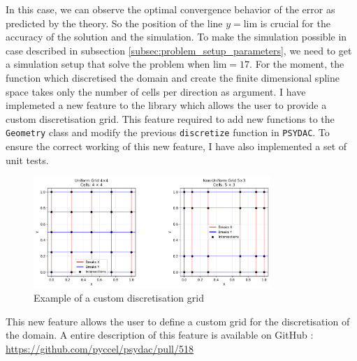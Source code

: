 \documentclass[a4paper,12pt,twoside]{report}
\begin{document}
In this case, we can observe the optimal convergence behavior of the error as predicted by the theory. So the position of the line $y = \text{lim}$ is crucial for the accuracy of the solution and the simulation.
To make the simulation possible in case described in subsection \ref{subsec:problem_setup_parameters}, we need to get a simulation setup that solve the problem when $\text{lim} = 17$.
For the moment, the function which discretised the domain and create the finite dimensional spline space takes only the number of cells per direction as argument. I have implemeted a new feature to the library which allows the user to provide a custom discretisation grid. This feature required to add new functions to the \texttt{Geometry} class and modify the previous \texttt{discretize} function in \texttt{PSYDAC}. To ensure the correct working of this new feature, I have also implemented a set of unit tests.
\begin{figure}[!h]
	\centering
	\includegraphics[width=0.8\textwidth]{figures/custom_grid.png}
	\caption{Example of a custom discretisation grid}
	\label{fig:custom_grid_example}
\end{figure}
This new feature allows the user to define a custom grid for the discretisation of the domain. A entire description of this feature is available on GitHub : \href{https://github.com/pyccel/psydac/pull/518}{https://github.com/pyccel/psydac/pull/518}
\end{document}
